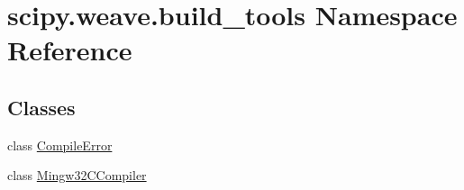 \hypertarget{namespacescipy_1_1weave_1_1build__tools}{}\section{scipy.\+weave.\+build\+\_\+tools Namespace Reference}
\label{namespacescipy_1_1weave_1_1build__tools}
\subsection*{Classes}
\begin{DoxyCompactItemize}
\item 
class \hyperlink{classscipy_1_1weave_1_1build__tools_1_1CompileError}{Compile\+Error}
\item 
class \hyperlink{classscipy_1_1weave_1_1build__tools_1_1Mingw32CCompiler}{Mingw32\+C\+Compiler}
\end{DoxyCompactItemize}
